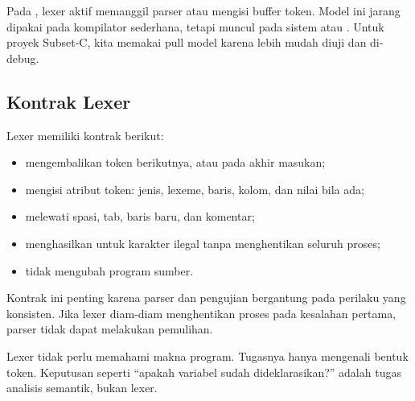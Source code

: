 Pada , lexer aktif memanggil parser atau mengisi
buffer token. Model ini jarang dipakai pada kompilator sederhana,
tetapi muncul pada sistem  atau .
Untuk proyek Subset-C, kita memakai pull model karena lebih mudah
diuji dan di-debug.

\subsection{Kontrak Lexer}

Lexer memiliki kontrak berikut:
\begin{itemize}[leftmargin=*]
  \item mengembalikan token berikutnya, atau  pada
        akhir masukan;
  \item mengisi atribut token: jenis, lexeme, baris, kolom, dan nilai
        bila ada;
  \item melewati spasi, tab, baris baru, dan komentar;
  \item menghasilkan  untuk karakter ilegal tanpa
        menghentikan seluruh proses;
  \item tidak mengubah program sumber.
\end{itemize}

Kontrak ini penting karena parser dan pengujian bergantung pada
perilaku yang konsisten. Jika lexer diam-diam menghentikan proses
pada kesalahan pertama, parser tidak dapat melakukan pemulihan.

\begin{infobox}
Lexer tidak perlu memahami makna program. Tugasnya hanya mengenali
bentuk token. Keputusan seperti ``apakah variabel sudah
dideklarasikan?'' adalah tugas analisis semantik, bukan lexer.
\end{infobox}
